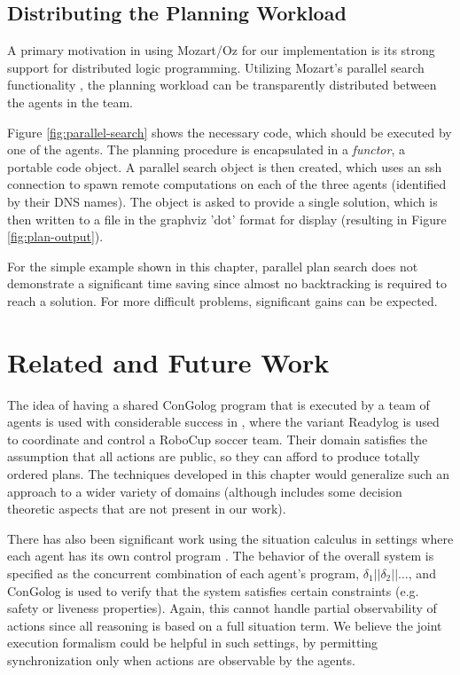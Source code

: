 \subsection{Distributing the Planning Workload}

A primary motivation in using Mozart/Oz for our implementation is
its strong support for distributed logic programming. Utilizing Mozart's
parallel search functionality \citep{Schulte00constraint_services},
the planning workload can be transparently distributed between the
agents in the team.

Figure \ref{fig:parallel-search} shows the necessary code, which
should be executed by one of the agents. The planning procedure is
encapsulated in a \emph{functor}, a portable code object. A parallel
search object is then created, which uses an ssh connection to spawn
remote computations on each of the three agents (identified by their
DNS names). The object is asked to provide a single solution, which
is then written to a file in the graphviz 'dot' format for display
(resulting in Figure \ref{fig:plan-output}).

For the simple example shown in this chapter, parallel plan search
does not demonstrate a significant time saving since almost no backtracking
is required to reach a solution. For more difficult problems, significant
gains can be expected.


\section{Related and Future Work}

\label{sec:Related-Work}

The idea of having a shared ConGolog program that is executed by a
team of agents is used with considerable success in \citep{Ferrein2005readylog},
where the variant Readylog is used to coordinate and control a RoboCup
soccer team. Their domain satisfies the assumption that all actions
are public, so they can afford to produce totally ordered plans. The
techniques developed in this chapter would generalize such an approach
to a wider variety of domains (although \citep{Ferrein2005readylog}
includes some decision theoretic aspects that are not present in our
work).

There has also been significant work using the situation calculus
in settings where each agent has its own control program \citep{shapiro02casl}.
The behavior of the overall system is specified as the concurrent
combination of each agent's program, $\delta_{1}||\delta_{2}||\dots$,
and ConGolog is used to verify that the system satisfies certain constraints
(e.g. safety or liveness properties). Again, this cannot handle partial
observability of actions since all reasoning is based on a full situation
term. We believe the joint execution formalism could be helpful in
such settings, by permitting synchronization only when actions are
observable by the agents.

